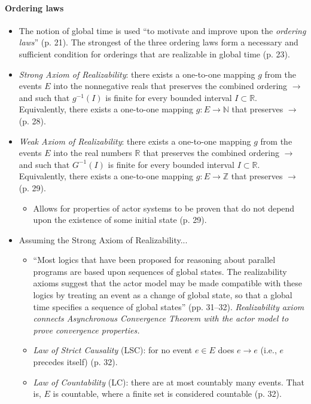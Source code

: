 \paragraph{Ordering laws}
\begin{itemize}
\item The notion of global time is used ``to motivate and improve upon the \emph{ordering laws}'' \cite{Hewitt1977b} (p. 21). The strongest of the three ordering laws form a necessary and sufficient condition for orderings that are realizable in global time (p. 23).
\item \emph{Strong Axiom of Realizability}: there exists a one-to-one mapping $g$ from the events $E$ into the nonnegative reals that preserves the combined ordering $\rightarrow$ and such that $g^{-1}(I)$ is finite for every bounded interval $I \subset \mathbb{R}$. Equivalently, there exists a one-to-one mapping $g: E \rightarrow \mathbb{N}$ that preserves $\rightarrow$ (p. 28).
\item \emph{Weak Axiom of Realizability}: there exists a one-to-one mapping $g$ from the events $E$ into the real numbers $\mathbb{R}$ that preserves the combined ordering $\rightarrow$ and such that $G^{-1}(I)$ is finite for every bounded interval $I \subset \mathbb{R}$. Equivalently, there exists a one-to-one mapping $g: E \rightarrow \mathbb{Z}$ that preserves $\rightarrow$ (p. 29).
	\begin{itemize}
	\item Allows for properties of actor systems to be proven that do not depend upon the existence of some initial state (p. 29).
	\end{itemize}
\item Assuming the Strong Axiom of Realizability...
	\begin{itemize}
	\item ``Most logics that have been proposed for reasoning about parallel programs are based upon sequences of global states. The realizability axioms suggest that the actor model may be made compatible with these logics by treating an event as a change of global state, so that a global time specifies a sequence of global states'' (pp. 31--32). \emph{Realizability axiom connects Asynchronous Convergence Theorem with the actor model to prove convergence properties.}
	\item \emph{Law of Strict Causality} (LSC): for no event $e \in E$ does $e \rightarrow e$ (i.e., $e$ precedes itself) (p. 32).
	\item \emph{Law of Countability} (LC): there are at most countably many events. That is, $E$ is countable, where a finite set is considered countable (p. 32).

\end{itemize}
\end{itemize}
